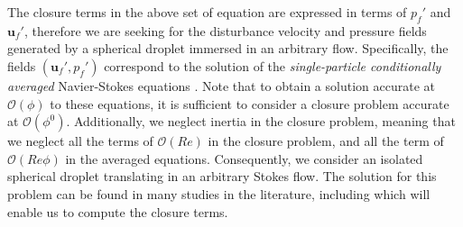 The closure terms in the above set of equation are expressed in terms of $p_f'$ and $\textbf{u}_f'$, therefore we are seeking for the disturbance velocity and pressure fields generated by a spherical droplet immersed in an arbitrary flow. 
Specifically, the fields $(\textbf{u}_f',p_f')$ correspond to the solution of the 
 \textit{single-particle conditionally averaged} Navier-Stokes equations \citep{hinch1977averaged,zhang1994averaged} . 
Note that to obtain a solution accurate at $\mathcal{O}(\phi)$ to these equations, it is sufficient to consider a closure problem accurate at $\mathcal{O}(\phi^0)$\citep{hinch1977averaged,zhang1994averaged}.
Additionally, we neglect inertia in the closure problem, meaning that we neglect all the terms of $\mathcal{O}(Re)$ in the closure problem, and all the term of $\mathcal{O}(Re\phi)$ in the averaged equations. 
Consequently, we consider an isolated spherical droplet translating in an arbitrary Stokes flow.
The solution for this problem can be found in many studies in the literature, including \citet{leal2007advanced,pozrikidis1992boundary,kim2013microhydrodynamics,pozrikidis2011introduction,nadim1991motion} which will enable us to compute the closure terms.

